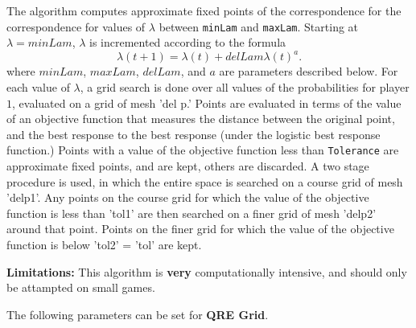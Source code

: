 \documentclass[12pt]{report}
\begin{document}
The algorithm computes approximate fixed points of the correspondence
for the correspondence for values of $\lambda$ between \verb+minLam+
and \verb+maxLam+.  Starting at $\lambda = minLam$, $\lambda$ is
incremented according to the formula $$ \lambda(t+1) = \lambda(t)
+delLam \lambda(t)^a.$$ where $minLam$, $maxLam$, $delLam$, and $a$
are parameters described below. For each value of $\lambda$, a grid
search is done over all values of the probabilities for player $1$,
evaluated on a grid of mesh 'del p.'  Points are evaluated in terms of
the value of an objective function that measures the distance between
the original point, and the best response to the best response (under
the logistic best response function.)  Points with a value of the
objective function less than \verb+Tolerance+ are approximate fixed
points, and are kept, others are discarded.  A two stage procedure is
used, in which the entire space is searched on a course grid of mesh
'delp1'.  Any points on the course grid for which the value of the
objective function is less than 'tol1' are then searched on a finer
grid of mesh 'delp2' around that point.  Points on the finer grid for
which the value of the objective function is below 'tol2' = 'tol' are
kept.

{\bf Limitations:} This algorithm is {\bf very} computationally
intensive, and should only be attampted on small games.

The following parameters can be set for {\bf QRE Grid}.
\end{document}
